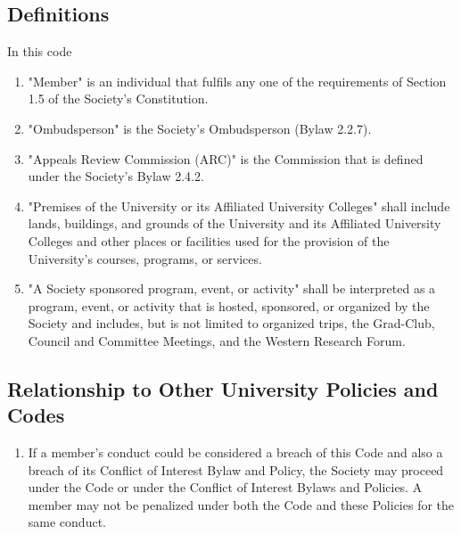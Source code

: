 \subsection{Definitions}
In this code
\begin{enumerate} [align=left]
\item "Member" is an individual that fulfils any one of the requirements of Section 1.5 of the Society's Constitution.
\item "Ombudsperson" is the Society's Ombudsperson (Bylaw 2.2.7).
\item "Appeals Review Commission (ARC)" is the Commission that is defined under the Society's Bylaw 2.4.2.
\item "Premises of the University or its Affiliated University Colleges" shall include lands, buildings, and grounds of the University and its Affiliated University Colleges and other places or facilities used for the provision of the University's courses, programs, or services.
\item "A Society sponsored program, event, or activity" shall be interpreted as a program, event, or activity that is hosted, sponsored, or organized by the Society and includes, but is not limited to organized trips, the Grad-Club, Council and Committee Meetings, and the Western Research Forum.
\end{enumerate}

\subsection{Relationship to Other University Policies and Codes}
\begin{enumerate} [align=left]
\item If a member's conduct could be considered a breach of this Code and also a breach of its Conflict of Interest Bylaw and Policy, the Society may proceed under the Code or under the Conflict of Interest Bylaws and Policies. A member may not be penalized under both the Code and these Policies for the same conduct.
\end{enumerate}

